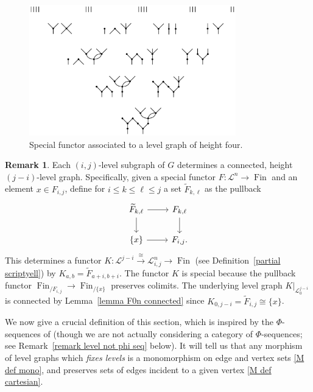 \documentclass{amsart}
\numberwithin{theorem}{subsection}
\theoremstyle{definition}
\newtheorem{remark}[theorem]{Remark}
\newcommand{\finset}{\operatorname{Fin}}
\newcommand{\scriptyell}{\mathscr L}
\begin{document}
\begin{figure}
\includegraphics[width=0.8\textwidth]{four_level_graph.pdf}
\caption{Special functor associated to a level graph of height four.}
\label{figure height four level graph}
\end{figure}

\begin{remark}\label{remark level sugraphs}
Each $(i,j)$-level subgraph of $G$ determines a connected, height $(j-i)$-level graph.
Specifically, given a special functor $F\colon \scriptyell^{n} \to \finset$ and an element $x\in F_{i,j}$, define for $i \leq k \leq \ell \leq j$ a set $\widetilde F_{k,\ell}$ as the pullback
\[
\begin{tikzcd}
\widetilde F_{k,\ell} \rar \dar & F_{k,\ell} \dar \\
\{ x \} \rar & F_{i,j}.
\end{tikzcd}
\]
This determines a functor $K\colon \scriptyell^{j-i} \overset\cong\to \scriptyell^n_{i,j} \to \finset$ (see Definition~\ref{partial scriptyell}) by $K_{a,b} = \widetilde F_{a+i,b+i}$.
The functor $K$ is special because the pullback functor $\finset_{/ F_{i,j}} \to \finset_{/ \{ x \}}$ preserves colimits. 
The underlying level graph $K|_{\scriptyell^{j-i}_0}$ is connected by Lemma~\ref{lemma F0n connected} since $K_{0,j-i} = \widetilde F_{i,j} \cong \{x\}$.
\end{remark}

We now give a crucial definition of this section, which is inspired by the $\Phi$-sequences of \cite{bar} (though we are not actually considering a category of $\Phi$-sequences; see Remark~\ref{remark level not phi seq} below).
It will tell us that any morphism of level graphs which \emph{fixes levels} is a monomorphism on edge and vertex sets \eqref{M def mono}, and preserves sets of edges incident to a given vertex \eqref{M def cartesian}.
\end{document}
